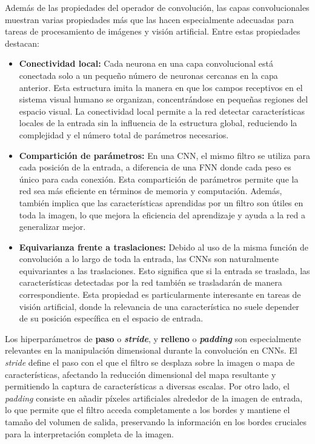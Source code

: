 Además de las propiedades del operador de convolución, las capas convolucionales muestran varias propiedades más que las hacen especialmente adecuadas para tareas de procesamiento de imágenes y visión artificial. Entre estas propiedades destacan:

\begin{itemize}
	\item \textbf{Conectividad local:}
	Cada neurona en una capa convolucional está conectada solo a un pequeño número de neuronas cercanas en la capa anterior. Esta estructura imita la manera en que los campos receptivos en el sistema visual humano se organizan, concentrándose en pequeñas regiones del espacio visual. La conectividad local permite a la red detectar características locales de la entrada sin la influencia de la estructura global, reduciendo la complejidad y el número total de parámetros necesarios.
	
	\item \textbf{Compartición de parámetros:}
	En una CNN, el mismo filtro se utiliza para cada posición de la entrada, a diferencia de una FNN donde cada peso es único para cada conexión. Esta compartición de parámetros permite que la red sea más eficiente en términos de memoria y computación. Además, también implica que las características aprendidas por un filtro son útiles en toda la imagen, lo que mejora la eficiencia del aprendizaje y ayuda a la red a generalizar mejor.
	
	\item \textbf{Equivarianza frente a traslaciones:}
	Debido al uso de la misma función de convolución a lo largo de toda la entrada, las CNNs son naturalmente equivariantes a las traslaciones. Esto significa que si la entrada se traslada, las características detectadas por la red también se trasladarán de manera correspondiente. Esta propiedad es particularmente interesante en tareas de visión artificial, donde la relevancia de una característica no suele depender de su posición específica en el espacio de entrada.
\end{itemize}

Los hiperparámetros de \textbf{paso} o \textbf{\textit{stride}}, y \textbf{relleno} o \textbf{\textit{padding}} son especialmente relevantes en la manipulación dimensional durante la convolución en CNNs. El \textit{stride} define el paso con el que el filtro se desplaza sobre la imagen o mapa de características, afectando la reducción dimensional del mapa resultante y permitiendo la captura de características a diversas escalas. Por otro lado, el \textit{padding} consiste en añadir píxeles artificiales alrededor de la imagen de entrada, lo que permite que el filtro acceda completamente a los bordes y mantiene el tamaño del volumen de salida, preservando la información en los bordes cruciales para la interpretación completa de la imagen.

